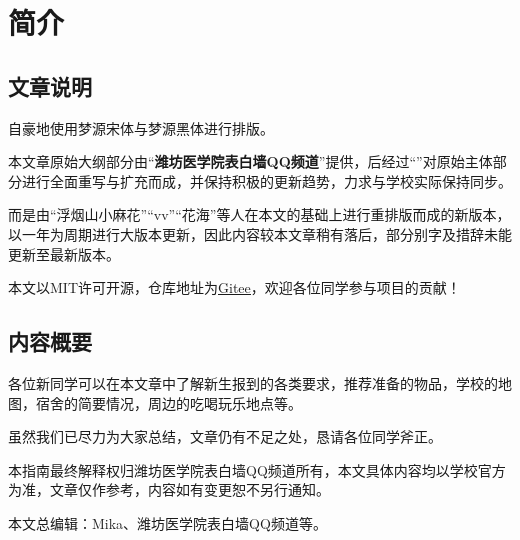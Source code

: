 \chapter[简介]{简介}
\section[文章说明]{文章说明}

自豪地使用梦源宋体与梦源黑体进行排版。

本文章原始大纲部分由“\textbf{潍坊医学院表白墙QQ频道}”提供，后经过“\textbf{}”对原始主体部分进行全面重写与扩充而成，并保持积极的更新趋势，力求与学校实际保持同步。

\bigbreak
而\textbf{}是由“浮烟山小麻花”“vv”“花海”等人在本文的基础上进行重排版而成的新版本，以一年为周期进行大版本更新，因此内容较本文章稍有落后，部分别字及措辞未能更新至最新版本。

\textbf{}

本文以MIT许可开源，仓库地址为\uline{\href{https://gitee.com/mikazo/guide_for_freshman}{Gitee}}，欢迎各位同学参与项目的贡献！

\section[内容概要]{内容概要}

各位新同学可以在本文章中了解新生报到的各类要求，推荐准备的物品，学校的地图，宿舍的简要情况，周边的吃喝玩乐地点等。

虽然我们已尽力为大家总结，文章仍有不足之处，恳请各位同学斧正。

本指南最终解释权归潍坊医学院表白墙QQ频道所有，本文具体内容均以学校官方为准，文章仅作参考，内容如有变更恕不另行通知。

本文总编辑：Mika、潍坊医学院表白墙QQ频道等。